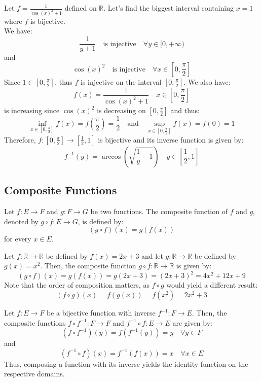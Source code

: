\begin{eg}
    Let $f = \frac{1}{\cos(x)^2 + 1}$ defined on $\mathbb{R}$. Let's find the biggest interval containing $x= 1$ where $f$ is bijective. \\
    We have:
    \[
        \frac{1}{y + 1} \quad \text{is injective} \quad \forall y \in [0, +\infty)
    \]
    and 
    \[
        \cos(x)^2 \quad \text{is injective} \quad  \forall x \in [0, \frac{\pi}{2}]
    \]
    Since $1 \in [0, \frac{\pi}{2}]$, thus $f$ is injective on the interval $\left[0, \frac{\pi}{2}\right]$. We also have:
    \[
        f(x) = \frac{1}{\cos(x)^2 + 1} \quad x \in \left[0, \frac{\pi}{2}\right]
    \]
    is increasing since $\cos(x)^2$ is decreasing on $\left[0, \frac{\pi}{2}\right]$ and thus:
    \[        
        \inf_{x \in \left[0, \frac{\pi}{2}\right]} f(x) = f\left(\frac{\pi}{2}\right) = \frac{1}{2} \quad \text{and} \quad \sup_{x \in \left[0, \frac{\pi}{2}\right]} f(x) = f(0) = 1
    \]
    Therefore, $f : \left[0, \frac{\pi}{2}\right] \to \left[\frac{1}{2}, 1\right]$ is bijective and its inverse function is given by:
    \[
        f^{-1}(y) = \arccos\left(\sqrt{\frac{1}{y} - 1}\right) \quad y \in \left[\frac{1}{2}, 1\right]
    \]
\end{eg}

\subsection{Composite Functions}
\begin{definition}
    Let $f : E \to F$ and $g : F \to G$ be two functions. The composite function of $f$ and $g$, denoted by $g \circ f : E \to G$, is defined by:
    \[
        (g \circ f)(x) = g(f(x))
    \]
    for every $x \in E$.
\end{definition}
\begin{eg}
    Let $f : \mathbb{R} \to \mathbb{R}$ be defined by $f(x) = 2x + 3$ and let $g : \mathbb{R} \to \mathbb{R}$ be defined by $g(x) = x^2$. Then, the composite function $g \circ f : \mathbb{R} \to \mathbb{R}$ is given by:
    \[
        (g \circ f)(x) = g(f(x)) = g(2x + 3) = (2x + 3)^2 = 4x^2 + 12x + 9
    \]
    Note that the order of composition matters, as $f \circ g$ would yield a different result:
    \[
        (f \circ g)(x) = f(g(x)) = f(x^2) = 2x^2 + 3
    \]
\end{eg}
\begin{eg}
    Let $f: E \to F$ be a bijective function with inverse $f^{-1} : F \to E$. Then, the composite functions $f \circ f^{-1} : F \to F$ and $f^{-1} \circ f : E \to E$ are given by:
    \[
        (f \circ f^{-1})(y) = f(f^{-1}(y)) = y \quad \forall y \in F
    \]
    and
    \[
        (f^{-1} \circ f)(x) = f^{-1}(f(x)) = x \quad \forall x \in E
    \]
    Thus, composing a function with its inverse yields the identity function on the respective domains.
\end{eg}

